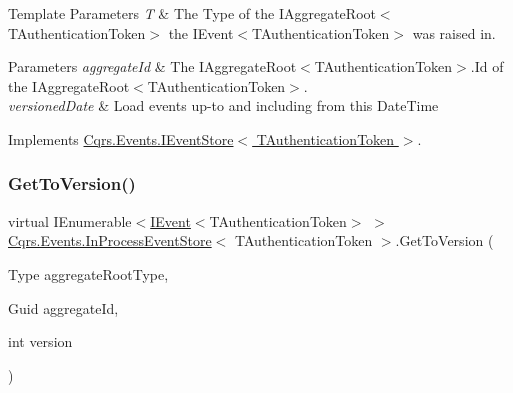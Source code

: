 \begin{DoxyTemplParams}{Template Parameters}
{\em T} & The Type of the I\+Aggregate\+Root$<$\+T\+Authentication\+Token$>$ the I\+Event$<$\+T\+Authentication\+Token$>$ was raised in.\\
\hline
\end{DoxyTemplParams}

\begin{DoxyParams}{Parameters}
{\em aggregate\+Id} & The I\+Aggregate\+Root$<$\+T\+Authentication\+Token$>$.\+Id of the I\+Aggregate\+Root$<$\+T\+Authentication\+Token$>$.\\
\hline
{\em versioned\+Date} & Load events up-\/to and including from this Date\+Time\\
\hline
\end{DoxyParams}


Implements \hyperlink{interfaceCqrs_1_1Events_1_1IEventStore_ae0d3304dcab1e6c94eb51b3a0eb645cd_ae0d3304dcab1e6c94eb51b3a0eb645cd}{Cqrs.\+Events.\+I\+Event\+Store$<$ T\+Authentication\+Token $>$}.

\mbox{\label{classCqrs_1_1Events_1_1InProcessEventStore_a88c16e2e7051094a5444a566f69119e7_a88c16e2e7051094a5444a566f69119e7}} 
\subsubsection{\texorpdfstring{Get\+To\+Version()}{GetToVersion()}}
{\footnotesize\ttfamily virtual I\+Enumerable$<$\hyperlink{interfaceCqrs_1_1Events_1_1IEvent}{I\+Event}$<$T\+Authentication\+Token$>$ $>$ \hyperlink{classCqrs_1_1Events_1_1InProcessEventStore}{Cqrs.\+Events.\+In\+Process\+Event\+Store}$<$ T\+Authentication\+Token $>$.Get\+To\+Version (\begin{DoxyParamCaption}\item[{Type}]{aggregate\+Root\+Type,  }\item[{Guid}]{aggregate\+Id,  }\item[{int}]{version }\end{DoxyParamCaption})\hspace{0.3cm}{\ttfamily [virtual]}}



